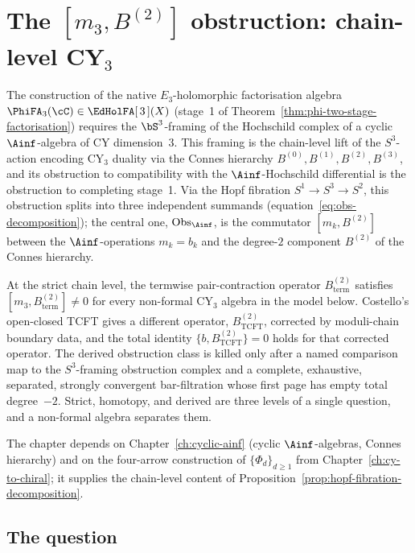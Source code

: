 \chapter{The \texorpdfstring{$[m_3, B^{(2)}]$}{[m3, B(2)]} obstruction: chain-level CY\texorpdfstring{$_3$}{-3}}
\label{ch:m3-b2-obstruction}

The construction of the native $E_3$-holomorphic factorisation algebra
$\PhiFA_3(\cC) \in \EdHolFA[\,3\,](X)$ (stage~1 of
Theorem~\ref{thm:phi-two-stage-factorisation}) requires the
$\bS^3$-framing of the Hochschild complex of a cyclic $\Ainf$-algebra
of CY dimension~$3$. This framing is the chain-level lift of the
$S^3$-action encoding CY$_3$ duality via the Connes hierarchy
$B^{(0)}, B^{(1)}, B^{(2)}, B^{(3)}$, and its obstruction to
compatibility with the $\Ainf$-Hochschild differential is the
obstruction to completing stage~1. Via the Hopf fibration
$S^1 \to S^3 \to S^2$, this obstruction splits into three independent
summands (equation~\eqref{eq:obs-decomposition}); the central one,
$\mathrm{Obs}_{\Ainf}$, is the commutator
$[m_k, B^{(2)}]$ between the $\Ainf$-operations
$m_k = b_k$ and the degree-$2$ component $B^{(2)}$ of the
Connes hierarchy.

At the strict chain level, the termwise pair-contraction operator
$B^{(2)}_{\mathrm{term}}$ satisfies
$[m_3, B^{(2)}_{\mathrm{term}}] \neq 0$ for every non-formal
CY$_3$ algebra in the model below.  Costello's
open-closed TCFT gives a different operator,
$B^{(2)}_{\mathrm{TCFT}}$, corrected by moduli-chain boundary
data, and the total identity
$\{b, B^{(2)}_{\mathrm{TCFT}}\}=0$ holds for that corrected
operator.  The derived obstruction class is killed only after a
named comparison map to the $S^3$-framing obstruction complex and
a complete, exhaustive, separated, strongly convergent
bar-filtration whose first page has empty total degree~$-2$.
Strict, homotopy, and derived are three levels of a single
question, and a non-formal algebra separates them.

The chapter depends on Chapter~\ref{ch:cyclic-ainf} (cyclic
$\Ainf$-algebras, Connes hierarchy) and on the four-arrow
construction of $\{\Phi_d\}_{d \geq 1}$ from Chapter~\ref{ch:cy-to-chiral}; it
supplies the chain-level content of
Proposition~\ref{prop:hopf-fibration-decomposition}.


\section{The question}
\label{sec:m3b2-question}

